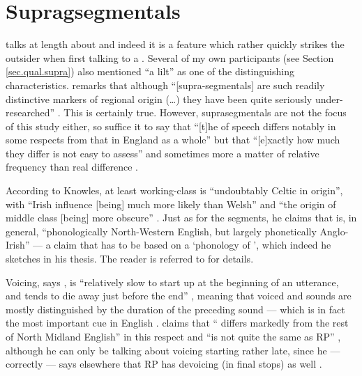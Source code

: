 	\section{Supragsegmentals}\label{sec.var.supra}

\citet{knowles1973} talks at length about   and indeed it is a feature which rather quickly strikes the outsider when first talking to a .
Several of my own participants (see Section \ref{sec.qual.supra}) also mentioned ``a lilt'' as one of the distinguishing characteristics.
\citeauthor{wales2006} remarks that although ``[supra-segmentals] are such readily distinctive markers of regional origin (\ldots) they have been quite seriously under-researched'' \citeyearpar[201]{wales2006}.
This is certainly true.
However, suprasegmentals are not the focus of this study either, so suffice it to say that ``[t]he  of  speech differs notably in some respects from that in England as a whole'' but that ``[e]xactly how much they differ is not easy to assess'' \citep[221]{knowles1973} and sometimes more a matter of relative frequency than real difference \citep[cf.][176]{knowles1973}.

According to Knowles, at least working-class  is ``undoubtably Celtic in origin'', with ``Irish influence [being] much more likely than Welsh'' \citep[221--222]{knowles1973} and ``the origin of middle class   [being] more obscure'' \citep[222--223]{knowles1973}.
Just as for the segments, he claims that   is, in general, ``phonologically North-Western English, but largely phonetically Anglo-Irish'' \citep[225]{knowles1973} --- a claim that has to be based on a `phonology of ', which indeed he sketches in his thesis.
The reader is referred to \citet[174--226]{knowles1973} for details.

Voicing, says \citeauthor{knowles1973}, is ``relatively slow to start up at the beginning of an utterance, and tends to die away just before the end'' \citeyearpar[246]{knowles1973}, meaning that voiced and  sounds are mostly distinguished by the duration of the preceding sound --- which is in fact the most important cue in English \citep[cf., for instance,][]{hoganrozsypal1980}. \citeauthor{knowles1973} claims that `` differs markedly from the rest of North Midland English'' in this respect and ``is not quite the same as RP'' \citeyearpar[246]{knowles1973}, although he can only be talking about voicing starting rather late, since he --- correctly --- says elsewhere that RP has devoicing (in final stops) as well \citeyearpar[cf.][114]{knowles1973}.

